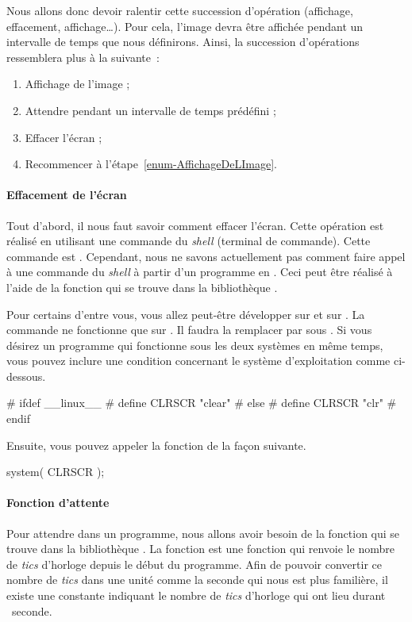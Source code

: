 \documentclass[a4paper]{article}
\begin{document}
				Nous allons donc devoir ralentir cette succession d'opération (affichage, effacement, affichage\dots{}).
				Pour cela, l'image devra être affichée pendant un intervalle de temps que nous définirons.
				Ainsi, la succession d'opérations ressemblera plus à la suivante~:
				\begin{enumerate}
					\item Affichage de l'image ;\label{enum-AffichageDeLImage}
					\item Attendre pendant un intervalle de temps prédéfini ;
					\item Effacer l'écran ;
					\item Recommencer à l'étape~\ref{enum-AffichageDeLImage}.
				\end{enumerate}

				\paragraph{Effacement de l'écran}
					Tout d'abord, il nous faut savoir comment effacer l'écran.
					Cette opération est réalisé en utilisant une commande du \emph{shell} (terminal de commande).
					Cette commande est .
					Cependant, nous ne savons actuellement pas comment faire appel à une commande du \emph{shell} à partir d'un programme en .
					Ceci peut être réalisé à l'aide de la fonction  qui se trouve dans la bibliothèque .

					Pour certains d'entre vous, vous allez peut-être développer sur  et sur .
					La commande  ne fonctionne que sur .
					Il faudra la remplacer par  sous .
					Si vous désirez un programme qui fonctionne sous les deux systèmes en même temps, vous pouvez inclure une condition concernant le système d'exploitation comme ci-dessous.
					\begin{Code*}
# ifdef __linux__
# define CLRSCR "clear"
# else
# define CLRSCR "clr"
# endif
					\end{Code*}

					Ensuite, vous pouvez appeler la fonction  de la façon suivante.
					\begin{Code*}
system( CLRSCR );
					\end{Code*}

				\paragraph{Fonction d'attente}
					Pour attendre dans un programme, nous allons avoir besoin de la fonction  qui se trouve dans la bibliothèque .
					La fonction  est une fonction qui renvoie le nombre de \emph{tics} d'horloge depuis le début du programme.
					Afin de pouvoir convertir ce nombre de \emph{tics} dans une unité comme la seconde qui nous est plus familière, il existe une constante  indiquant le nombre de \emph{tics} d'horloge qui ont lieu durant ~seconde.
\end{document}
